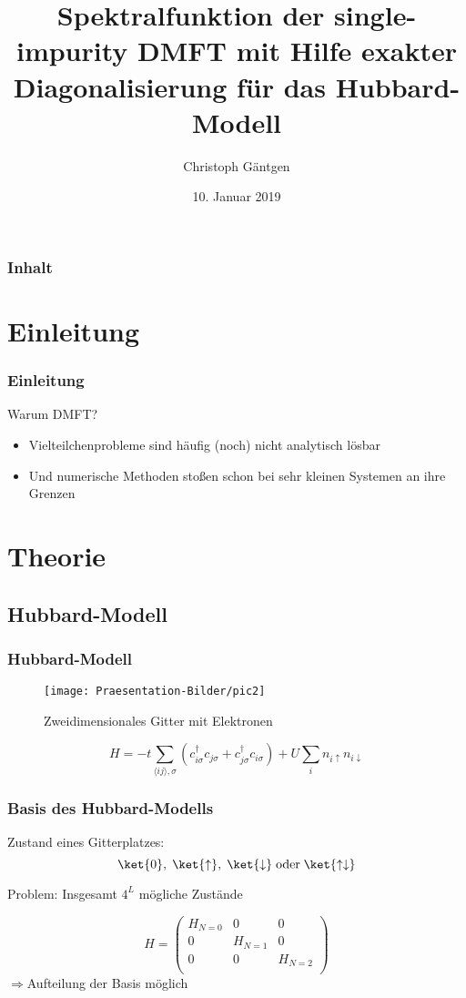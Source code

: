 \documentclass{beamer}
\title{Spektralfunktion der single-impurity DMFT mit Hilfe exakter Diagonalisierung für das Hubbard-Modell}
\author{Christoph Gäntgen}
\institute[]{Physikalisches Institut\\
	Rheinische Friedrich-Wilhelms-Universität Bonn}
\date{10. Januar 2019}
\begin{document}
\begin{frame}
\titlepage
\end{frame}

\begin{frame}
\frametitle{Inhalt}
\tableofcontents
\end{frame}

\section{Einleitung}
\begin{frame}
\frametitle{Einleitung}
Warum DMFT?
\begin{itemize}
	\item Vielteilchenprobleme sind häufig (noch) nicht analytisch lösbar
	\item Und numerische Methoden stoßen schon bei sehr kleinen Systemen an ihre Grenzen
\end{itemize}
\end{frame}

\section{Theorie}
\subsection{Hubbard-Modell}
\begin{frame}
\frametitle{Hubbard-Modell}
\begin{figure}[h!]
	\centering
	\texttt{[image: Praesentation-Bilder/pic2]}
	\caption{Zweidimensionales Gitter mit Elektronen}
	\label{fig:pic2}
\end{figure}

\pause
\begin{equation*}\label{Hubbard_standard}
H = -t\sum_{\langle ij\rangle,\sigma}\left( c_{i\sigma}^\dag c_{j\sigma} + c_{j\sigma}^\dag c_{i\sigma}\right) + U \sum_{i}n_{i\uparrow}n_{i\downarrow}
\end{equation*}
\end{frame}

\begin{frame}
\frametitle{Basis des Hubbard-Modells}
Zustand eines Gitterplatzes:\\
\[ \ket{0},\; \ket{\uparrow},\; \ket{\downarrow}\; \text{oder} \; \ket{\uparrow\downarrow}\]\pause
\begin{block}{Problem:}
Insgesamt $ 4^L $ mögliche Zustände
\end{block}\pause
\[ H=\left( \begin{array}{ccc}
H_{N=0}  & 0 & 0\\
0 & H_{N=1} & 0\\
0 & 0 & H_{N=2}\\
\end{array}\right)  \]
$ \Rightarrow $Aufteilung der Basis möglich
\end{frame}
\end{document}
